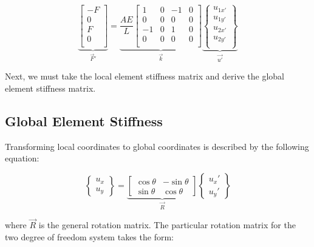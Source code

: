 \begin{equation}
	\underbrace{
		\begin{bmatrix}
			-F\\ 0\\ F\\ 0\\
		\end{bmatrix}
	}_{\vec{F}'}
	=
	\underbrace{
		\frac{AE}{L}
		\begin{bmatrix}
			1 & 0 & -1 & 0\\
			0 & 0 & 0 & 0\\
			-1 & 0 & 1 & 0\\
			0 & 0 & 0 & 0\\
		\end{bmatrix}
	}_{\vec{k}}
	\underbrace{
		\begin{Bmatrix}
			u_{1x'}\\ u_{1y'}\\ u_{2x'}\\ u_{2y'}\\
		\end{Bmatrix}
	}_{\vec{u'}}
	\label{Eq:F=ku}
\end{equation}

Next, we must take the local element stiffness matrix and derive the global element stiffness matrix.

\subsection{Global Element Stiffness}

Transforming local coordinates to global coordinates is described by the following equation:

\begin{equation}
	\begin{Bmatrix}
		u_x\\ u_y
	\end{Bmatrix}
	=
	\underbrace{
	\begin{bmatrix}
		\cos\theta & -\sin\theta\\
		\sin\theta & \cos\theta
	\end{bmatrix}
	}_{\vec{R}}
	\begin{Bmatrix}
		u_x'\\ u_y'
	\end{Bmatrix}
\end{equation}

where $\vec{R}$ is the general rotation matrix. The particular rotation matrix for the two degree of freedom system takes the form:

